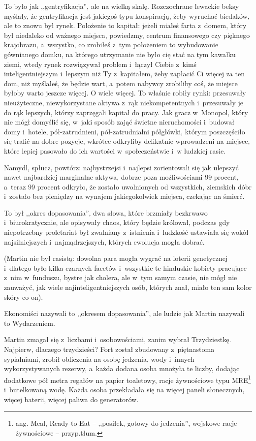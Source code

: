 \documentclass[oneside,polish,11pt,sfheadings]{mwbk}
\begin{document}
To było jak ,,gentryfikacja'', ale na wielką skalę. Rozczochrane
lewackie beksy myślały, że gentryfikacja jest jakiegoś typu konspiracją,
żeby wyruchać biedaków, ale to znowu był rynek. Położenie to kapitał:
jeżeli miałeś farta z~domem, który był niedaleko od ważnego miejsca,
powiedzmy, centrum finansowego czy pięknego krajobrazu, a~wszystko, co
zrobiłeś z~tym położeniem to wybudowanie gównianego domku, na którego
utrzymanie nie było cię stać na tym kawałku ziemi, wtedy rynek
rozwiązywał problem i~łączył Ciebie z~kimś inteligentniejszym i~lepszym
niż Ty z~kapitałem, żeby zapłacić Ci więcej za ten dom, niż myślałeś, że
będzie wart, a~potem nabywcy zrobiliby coś, że miejsce byłoby warto
jeszcze więcej. O wiele więcej. To właśnie robiły rynki: przesuwały
nieużyteczne, niewykorzystane aktywa z~rąk niekompetentnych i~przesuwały
je do rąk lepszych, którzy zaprzęgali kapitał do pracy. Jak gracz w~Monopol, który nie mógł domyślić się, w~jaki sposób zająć świetne
nieruchomości i~budował domy i~hotele, pół-zatrudnieni, pół-zatrudnialni
półgłówki, którym poszczęściło się trafić na dobre pozycje, wkrótce
odkryliby delikatnie wprowadzeni na miejsce, które lepiej pasowało do
ich wartości w~społeczeństwie i~w ludzkiej rasie.

Namydl, spłucz, powtórz: najbystrzejsi i~najlepsi zorientowali się jak
ulepszyć nawet najbardziej marginalne aktywa, dobrze poza możliwościami
99 procent, a~teraz 99 procent odkryło, że zostało uwolnionych od
wszystkich, ziemskich dóbr i~zostało bez pieniędzy na wynajem
jakiegokolwiek miejsca, czekając na śmierć.

To był ,,okres dopasowania'', dwa słowa, które brzmiały bezkrwawo i~biurokratycznie, ale opisywały chaos, który będzie królował, podczas gdy
niepotrzebny proletariat był zwalniany z~istnienia i~ludzkość ustawiała
się wokół najsilniejszych i~najmądrzejszych, których ewolucja mogła
dobrać.

(Martin nie był rasistą: dowolna para mogła wygrać na loterii
genetycznej i~dlatego było kilka czarnych facetów i~wszystkie te
hinduskie kobiety pracujące z~nim w~funduszu, bystre jak cholera, ale w~tym samym czasie, nie mógł nie zauważyć, jak wiele
najinteligentniejszych osób, których znał, miało ten sam kolor skóry co
on).

Ekonomiści nazywali to ,,okresem dopasowania'', ale ludzie jak Martin
nazywali to Wydarzeniem.

Martin zmagał się z~liczbami i~osobowościami, zanim wybrał Trzydziestkę.
Najpierw, dlaczego trzydzieści? Fort został zbudowany z~piętnastoma
sypialniami, zrobił obliczenia na osobę jedzenia, wody i~innych
wykorzystywanych rezerwy, a~każda dodana osoba mnożyła te liczby,
dodając dodatkowe pół metra regałów na papier toaletowy, racje
żywnościowe typu MRE\footnote{ ang. Meal, Ready-to-Eat -- ,,posiłek, gotowy do
jedzenia'', wojskowe racje żywnościowe -- przyp.tłum.} i~butelkowaną
wodę. Każda osoba przekładała się na więcej paneli słonecznych, więcej
baterii, więcej paliwa do generatorów.
\end{document}
